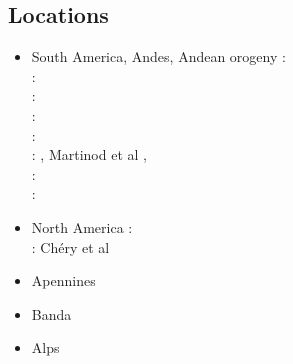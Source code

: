 \subsection{Locations}

\begin{itemize}
\item South America, Andes, Andean orogeny 
{\scriptsize
\nineteenninetyfour: \cite{wdbo94b}\\
\twothousand: \cite{gusb00}\\
\twothousandtwo: \cite{vavv02b}\\
\cite{baso05}\cite{soba05}
\cite{basv06}\cite{meph06}\cite{iabd06}\cite{oncf06}\cite{sobk06}
\cite{iabb07}
\cite{esfm08}\cite{heib08}\cite{iabu08}
\cite{kecw09}\cite{gecm09}
\cite{hucf12}\cite{shlm12}\cite{iadc12}
\twothousandthirteen: \cite{waja13}\\
\twothousandfifteen: \cite{cudd15}\cite{ealw15}\\
\twothousandsixteen: \cite{robn16}, Martinod et al \cite{marl16}, \cite{chdf16}\cite{hulh16}\\
\twothousandseventeen: \cite{sche17}\\
\twothousandnineteen: \cite{yamg19}
}
\item North America 
{\scriptsize
\cite{sabu73}
\cite{huha90}
\nineteenninetyseven: \cite{bugm97}\\
\twothousandone: Ch\'ery et al \cite{chzh01} \\
\cite{besb06}
\cite{splg08}
\cite{splg09}
\cite{beck12}
\cite{ghbh13}\cite{simi13}
\cite{riag15}
}
\item Apennines 
{\scriptsize
\cite{buwg98}
\cite{shpy07}
\cite{rohu09}
\cite{vami15}
}

\item Banda 
{\scriptsize
\cite{rohu09}
\cite{spha10}
}

\item Alps 


\end{itemize}
